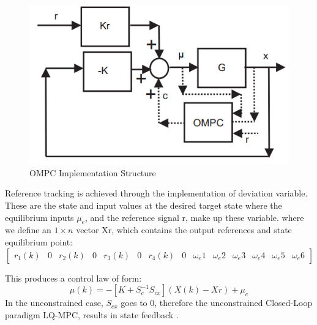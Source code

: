 \documentclass[12pt,a4paper,twoside]{report}
\begin{document}
				\begin{figure}[h!]
					\centering
					\includegraphics[width=0.8\linewidth]{OMPC2.png}
					\caption{OMPC Implementation Structure}
					\label{fig:ompcimplementationstructure}
				\end{figure}
				Reference tracking is achieved through the implementation of deviation variable. These are the state and input values at the desired target state where the equilibrium inputs $\mu_e$, and the reference signal r, make up these variable. where we define an $1 \times n$ vector Xr, which contains the output references and state equilibrium point:
				\begin{equation}
					\begin{bmatrix}
						r_1(k)&0&r_2(k)&0&r_3(k)&0&r_4(k)&0&\omega_e1&\omega_e2&\omega_e3&\omega_e4&\omega_e5&\omega_e6
					\end{bmatrix}
				\end{equation}
				
				This produces a control law of form:
				\begin{equation}
					\mu(k) = - [K + S_c^{-1}S_{cx}]( X(k)- Xr) + \mu_e
				\end{equation}
				In the unconstrained case, $S_{cx}$ goes to 0, therefore the unconstrained Closed-Loop paradigm LQ-MPC, results in state feedback \cite{26}.
				
\end{document}
